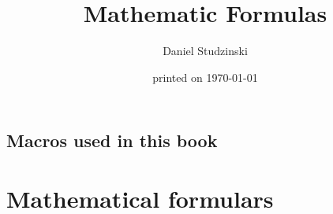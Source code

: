 \documentclass[a4paper,10pt,twoside,titlepage]{book}
\begin{document}
\newsavebox{\mySd}

\title{Mathematic Formulas}
\date{printed on \today}
\author{Daniel Studzinski}
\maketitle
\section*{Macros used in this book}
   \label{DSmyMacro}\clearpage
\tableofcontents                  \cleardoublepage

\chapter{Mathematical formulars}













\printindex
\end{document}

